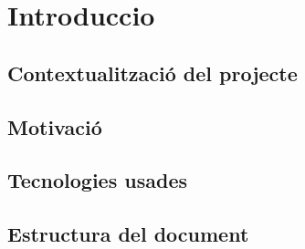 \chapter{Introduccio}
\section{Contextualització del projecte}
\section{Motivació}
\section{Tecnologies usades}
\section{Estructura del document}